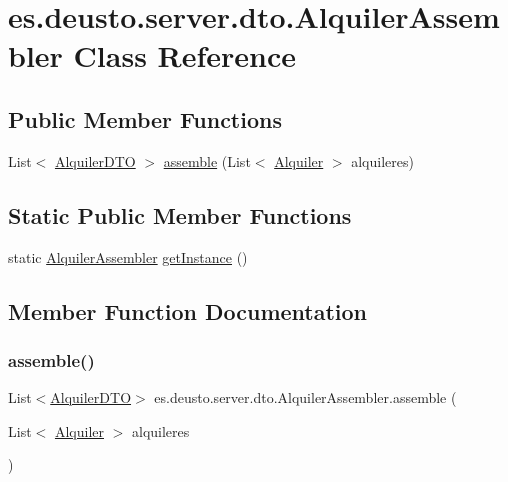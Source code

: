 \hypertarget{classes_1_1deusto_1_1server_1_1dto_1_1_alquiler_assembler}{}\section{es.\+deusto.\+server.\+dto.\+Alquiler\+Assembler Class Reference}
\label{classes_1_1deusto_1_1server_1_1dto_1_1_alquiler_assembler}
\subsection*{Public Member Functions}
\begin{DoxyCompactItemize}
\item 
List$<$ \mbox{\hyperlink{classes_1_1deusto_1_1server_1_1dto_1_1_alquiler_d_t_o}{Alquiler\+D\+TO}} $>$ \mbox{\hyperlink{classes_1_1deusto_1_1server_1_1dto_1_1_alquiler_assembler_aab2b9908ded052aa9016385f580e40ed}{assemble}} (List$<$ \mbox{\hyperlink{classes_1_1deusto_1_1client_1_1data_1_1_alquiler}{Alquiler}} $>$ alquileres)
\end{DoxyCompactItemize}
\subsection*{Static Public Member Functions}
\begin{DoxyCompactItemize}
\item 
static \mbox{\hyperlink{classes_1_1deusto_1_1server_1_1dto_1_1_alquiler_assembler}{Alquiler\+Assembler}} \mbox{\hyperlink{classes_1_1deusto_1_1server_1_1dto_1_1_alquiler_assembler_a6a6df1d924b88c6aac0b4b0a6c88e111}{get\+Instance}} ()
\end{DoxyCompactItemize}


\subsection{Member Function Documentation}
\mbox{\label{classes_1_1deusto_1_1server_1_1dto_1_1_alquiler_assembler_aab2b9908ded052aa9016385f580e40ed}} 
\subsubsection{\texorpdfstring{assemble()}{assemble()}}
{\footnotesize\ttfamily List$<$\mbox{\hyperlink{classes_1_1deusto_1_1server_1_1dto_1_1_alquiler_d_t_o}{Alquiler\+D\+TO}}$>$ es.\+deusto.\+server.\+dto.\+Alquiler\+Assembler.\+assemble (\begin{DoxyParamCaption}\item[{List$<$ \mbox{\hyperlink{classes_1_1deusto_1_1client_1_1data_1_1_alquiler}{Alquiler}} $>$}]{alquileres }\end{DoxyParamCaption})}


